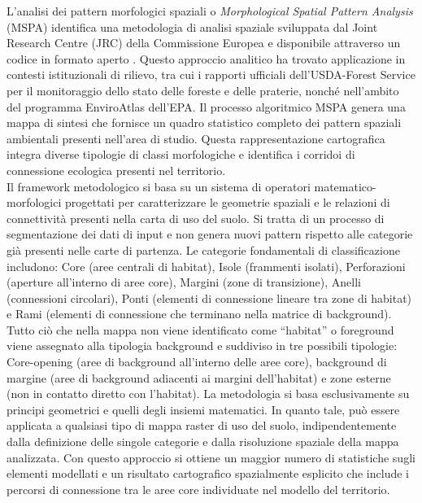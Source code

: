 \documentclass[
  a4paper,
]{book}
\begin{document}
L'analisi dei pattern morfologici spaziali o \emph{Morphological Spatial Pattern Analysis} (MSPA) identifica una metodologia di analisi spaziale sviluppata dal Joint Research Centre (JRC) della Commissione Europea e disponibile attraverso un codice in formato aperto \citep{vogtGuidosToolboxUniversalDigital2017, vogtAbbreviationLarvalDevelopment2013, vogtMeasuringForestSpatial2025}.
Questo approccio analitico ha trovato applicazione in contesti istituzionali di rilievo, tra cui i rapporti ufficiali dell'USDA-Forest Service per il monitoraggio dello stato delle foreste e delle praterie, nonché nell'ambito del programma EnviroAtlas dell'EPA. Il processo algoritmico MSPA genera una mappa di sintesi che fornisce un quadro statistico completo dei pattern spaziali ambientali presenti nell'area di studio.
Questa rappresentazione cartografica integra diverse tipologie di classi morfologiche e identifica i corridoi di connessione ecologica presenti nel territorio.\\
Il framework metodologico si basa su un sistema di operatori matematico-morfologici progettati per caratterizzare le geometrie spaziali e le relazioni di connettività presenti nella carta di uso del suolo.
Si tratta di un processo di segmentazione dei dati di input e non genera nuovi pattern rispetto alle categorie già presenti nelle carte di partenza.
Le categorie fondamentali di classificazione includono: Core (aree centrali di habitat), Isole (frammenti isolati), Perforazioni (aperture all'interno di aree core), Margini (zone di transizione), Anelli (connessioni circolari), Ponti (elementi di connessione lineare tra zone di habitat) e Rami (elementi di connessione che terminano nella matrice di background).
Tutto ciò che nella mappa non viene identificato come ``habitat'' o foreground viene assegnato alla tipologia background e suddiviso in tre possibili tipologie: Core-opening (aree di background all'interno delle aree core), background di margine (aree di background adiacenti ai margini dell'habitat) e zone esterne (non in contatto diretto con l'habitat).
La metodologia si basa esclusivamente su principi geometrici e quelli degli insiemi matematici.
In quanto tale, può essere applicata a qualsiasi tipo di mappa raster di uso del suolo, indipendentemente dalla definizione delle singole categorie e dalla risoluzione spaziale della mappa analizzata.
Con questo approccio si ottiene un maggior numero di statistiche sugli elementi modellati e un risultato cartografico spazialmente esplicito che include i percorsi di connessione tra le aree core individuate nel modello del territorio.
\end{document}
